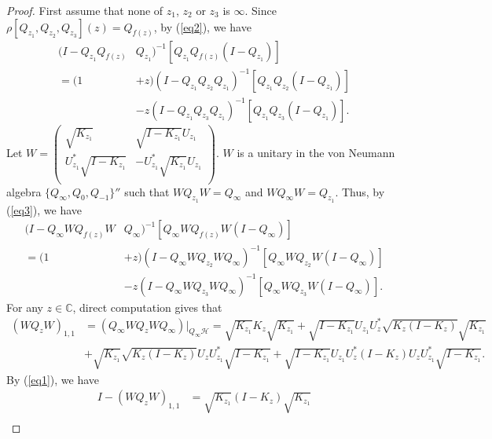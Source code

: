 \documentclass{amsart}
\newcommand{\HHH}{\mathcal H} %
\newcommand{\C}{\mathbb C} %
\begin{document}
\begin{proof}
First assume that none of $z_1$, $z_2$ or $z_3$ is $\infty$.
Since $\rho[Q_{z_1}, Q_{z_2}, Q_{z_3}](z) = Q_{f(z)}$, by (\ref{eq2}), we have
\begin{equation}\label{eq3}
\begin{split}
(I - Q_{z_1} Q_{f(z)}&Q_{z_1})^{-1}[Q_{z_1}Q_{f(z)}(I-Q_{z_1})]\\
=(1 &+z)(I - Q_{z_1}Q_{z_2}Q_{z_1})^{-1}[Q_{z_1}Q_{z_2}(I-Q_{z_1})] \\
 & - z(I - Q_{z_1}Q_{z_3}Q_{z_1})^{-1}[Q_{z_1}Q_{z_3}(I-Q_{z_1})].
\end{split}
\end{equation}
Let $W = \left(
           \begin{array}{cc}
             \sqrt{K_{z_1}} & \sqrt{I-K_{z_1}}U_{z_1} \\
             U^*_{z_1}\sqrt{I-K_{z_1}} & -U^*_{z_1}\sqrt{K_{z_1}}U_{z_1} \\
           \end{array}
         \right)$. $W$ is a unitary in the von Neumann algebra $\{Q_{\infty}, Q_{0}, Q_{-1} \}''$ such that $WQ_{z_1}W = Q_{\infty}$ and $WQ_{\infty}W = Q_{z_1}$. Thus, by (\ref{eq3}), we have 
\begin{equation}\label{eq4}
\begin{split}
(I - Q_{\infty} WQ_{f(z)}W&Q_{\infty})^{-1}[Q_{\infty}WQ_{f(z)}W(I-Q_{\infty})]\\
=(1 &+z)(I - Q_{\infty}WQ_{z_2}WQ_{\infty})^{-1}[Q_{\infty}WQ_{z_2}W(I-Q_{\infty})] \\
 & - z(I - Q_{\infty}WQ_{z_3}WQ_{\infty})^{-1}[Q_{\infty}WQ_{z_3}W(I-Q_{\infty})].
\end{split}
\end{equation}
For any $z \in \C$, direct computation gives that 
\begin{align*}
(WQ_{z}W)_{1,1}  &= (Q_{\infty} WQ_{z}W Q_{\infty})|_{Q_{\infty}\HHH}= \sqrt{K_{z_1}}K_{z}\sqrt{K_{z_1}} + \sqrt{I - K_{z_1}}U_{z_1}U^{*}_{z}\sqrt{K_{z} (I - K_{z})}\sqrt{K_{z_1}} \\
                &  +\sqrt{K_{z_1}}\sqrt{K_{z}(I-K_{z})}U_{z}U_{z_1}^{*} \sqrt{I-K_{z_1}} + \sqrt{I-K_{z_1}}U_{z_1}U^{*}_{z}(I - K_z)U_{z}U^{*}_{z_1}\sqrt{I - K_{z_1}}.
\end{align*}
By (\ref{eq1}), we have
\begin{equation}\label{eq5}
\begin{split}
I - (WQ_{z}W)_{1,1} &= \sqrt{K_{z_1}}(I - K_{z})\sqrt{K_{z_1}} \\

\end{split}
\end{equation}
\end{proof}
\end{document}
